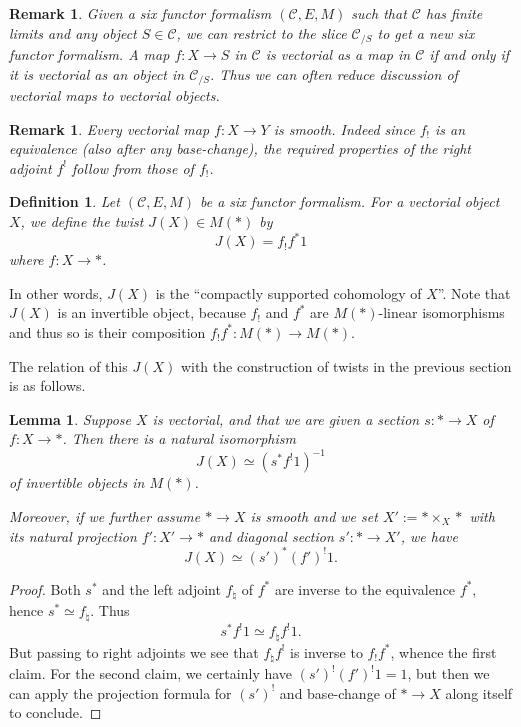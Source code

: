 \documentclass[12pt]{article}
\newtheorem{lemma}[theorem]{Lemma}
\newtheorem{definition}[theorem]{Definition}
\newtheorem{remark}[theorem]{Remark}
\newcommand{\mc}{\mathcal}
\begin{document}
\begin{remark}
Given a six functor formalism $(\mc{C},E,M)$ such that $\mc{C}$ has finite limits and any object $S\in \mc{C}$, we can restrict to the slice $\mc{C}_{/S}$ to get a new six functor formalism.  A map $f:X\to S$ in $\mathcal{C}$ is vectorial as a map in $\mc{C}$ if and only if it is vectorial as an object in $\mc{C}_{/S}$.  Thus we can often reduce discussion of vectorial maps to vectorial objects.
\end{remark}

\begin{remark}
Every vectorial map $f:X\to Y$ is smooth.  Indeed since $f_!$ is an equivalence (also after any base-change), the required properties of the right adjoint $f^!$ follow from those of $f_!$.
\end{remark}

\begin{definition}\label{jdef}
Let $(\mc{C},E,M)$ be a six functor formalism.  For a vectorial object $X$, we define the twist $J(X)\in M(\ast)$ by
$$J(X) = f_!f^\ast 1$$
where $f:X\to \ast$.
\end{definition}

In other words, $J(X)$ is the ``compactly supported cohomology of $X$''.  Note that $J(X)$ is an invertible object, because $f_!$ and $f^\ast$ are $M(\ast)$-linear isomorphisms and thus so is their composition $f_!f^\ast:M(\ast)\to M(\ast)$.  

The relation of this $J(X)$ with the construction of twists in the previous section is as follows.

\begin{lemma}\label{comparetwists}
Suppose $X$ is vectorial, and that we are given a section $s:\ast \to X$ of $f:X\to \ast$.  Then there is a natural isomorphism
$$J(X) \simeq (s^\ast f^! 1)^{-1}$$
of invertible objects in $M(\ast)$.

Moreover, if we further assume $\ast \to X$ is smooth and we set $X':=\ast\times_X \ast$ with its natural projection $f':X'\to \ast$ and diagonal section $s':\ast\to X'$, we have
$$J(X) \simeq (s')^\ast (f')^! 1.$$
\end{lemma}
\begin{proof}
Both $s^\ast$ and the left adjoint $f_\natural$ of $f^\ast$ are inverse to the equivalence $f^\ast$, hence $s^\ast \simeq f_\natural$.  Thus 
$$s^\ast f^! 1 \simeq f_\natural f^! 1.$$
But passing to right adjoints we see that $f_\natural f^!$ is inverse to $f_! f^\ast$, whence the first claim.  For the second claim, we certainly have $(s')^! (f')^!1=1$, but then we can apply the projection formula for $(s')^!$ and base-change of $\ast \to X$ along itself to conclude.
\end{proof}
\end{document}
